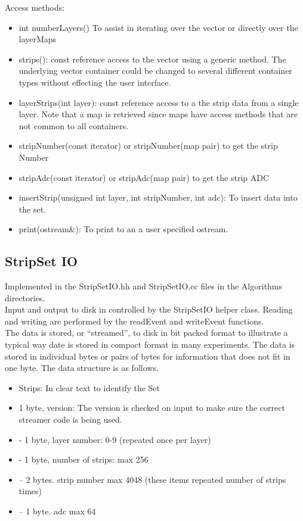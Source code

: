 \documentclass[aps,prd,superscriptaddress,floatfix]{revtex4}
\begin{document}
Access methods:
\begin{itemize}
\item int numberLayers() To assist in iterating over the vector or directly over the layerMaps
\item strips(): const reference access to the vector using a generic method. The underlying vector container could be 
changed to several different container types without effecting the user interface.
\item layerStrips(int layer): const reference access to a the strip
  data from a single layer. Note that a map is retrieved since maps
  have access methods that are not common to all containers.
\item stripNumber(const iterator) or stripNumber(map pair) to get the
  strip Number
\item stripAdc(const iterator) or stripAdc(map pair) to get the
  strip ADC
\item insertStrip(unsigned int layer, int stripNumber, int adc):  To insert data into the set.
\item print(ostream\&): To print to an a user specified ostream.
\end{itemize}

\subsection{StripSet IO}
Implemented in the StripSetIO.hh and StripSetIO.cc files in the Algorithms directories.
\\

Input and output to disk in controlled by the StripSetIO helper class.  Reading and writing
are performed by the readEvent and writeEvent functions.
\\

The data is stored, or ``streamed'', to disk in bit packed format to illustrate a typical way date is stored in compact
format in many experiments.  The data is stored in individual bytes or pairs of bytes for information
that does not fit in one byte.  The data structure is as follows.
\begin{itemize}
\item Strips: In clear text to identify the Set
\item  1 byte, version: The version is checked on input to make sure the correct streamer code is being used.
\item - 1 byte, layer number: 0-9 (repeated once per layer)
\item - 1 byte, number of strips: max 256
\item -- 2 bytes. strip number max 4048  (these items repeated number of strips times)
\item -- 1 byte. adc max 64 
\end{itemize}
\end{document}
